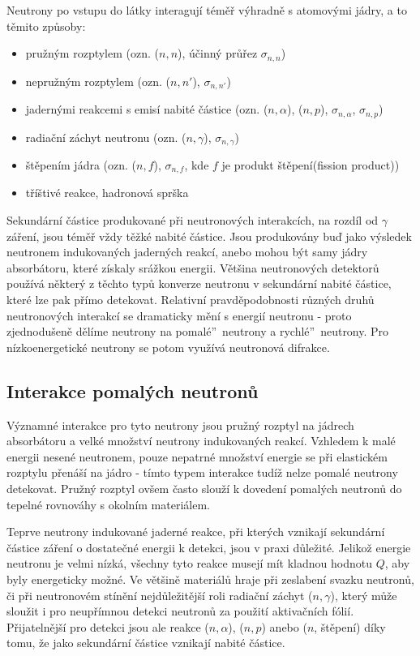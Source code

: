 \documentclass[../../main.tex]{subfiles}
\begin{document}
Neutrony po vstupu do látky interagují téměř výhradně s atomovými jádry, a to těmito způsoby:
\begin{itemize}
	\item pružným rozptylem (ozn. ($n,n$), účinný průřez $\sigma _{n,n}$)
	\item nepružným rozptylem (ozn. ($n,n'$), $\sigma_{n,n'}$)
	\item jadernými reakcemi s emisí nabité částice (ozn. ($n,\alpha$), ($n,p$), $\sigma_{n,\alpha}$, $\sigma_{n,p}$)
	\item radiační záchyt neutronu (ozn. ($n,\gamma$), $\sigma_{n,\gamma}$)
	\item štěpením jádra (ozn. ($n,f$), $\sigma_{n,f}$, kde $f$ je produkt štěpení(fission product))
	\item tříštivé reakce, hadronová sprška
\end{itemize}
Sekundární částice produkované při neutronových interakcích, na rozdíl od $\gamma$ záření, jsou téměř vždy těžké nabité částice. Jsou produkovány buď  jako výsledek neutronem indukovaných jaderných reakcí, anebo mohou být samy jádry absorbátoru, které získaly srážkou energii. Většina neutronových detektorů používá některý z těchto typů konverze neutronu v sekundární nabité částice, které lze pak přímo detekovat. Relativní pravděpodobnosti různých druhů neutronových interakcí se dramaticky mění s energií neutronu - proto zjednodušeně dělíme neutrony na \quotedblbase pomalé\textquotedblright ~neutrony a \quotedblbase rychlé\textquotedblright ~neutrony. Pro nízkoenergetické neutrony se potom využívá neutronová difrakce.

\subsection{Interakce pomalých neutronů}

Významné interakce pro tyto neutrony jsou pružný rozptyl na jádrech absorbátoru a velké množství neutrony indukovaných reakcí. Vzhledem k malé energii nesené neutronem, pouze nepatrné množství energie se při elastickém rozptylu přenáší na jádro - tímto typem interakce tudíž nelze pomalé neutrony detekovat. Pružný rozptyl ovšem často slouží k dovedení pomalých neutronů do tepelné rovnováhy s okolním materiálem.

Teprve neutrony indukované jaderné reakce, při kterých vznikají sekundární částice záření o dostatečné energii k detekci, jsou v praxi důležité. Jelikož energie neutronu je velmi nízká, všechny tyto reakce musejí mít kladnou hodnotu $Q$, aby byly energeticky možné. Ve většině materiálů hraje při zeslabení svazku neutronů, či při neutronovém stínění nejdůležitější roli radiační záchyt ($n, \gamma$), který může sloužit i pro neupřímnou detekci neutronů za použití aktivačních fólií. Přijatelnější pro detekci jsou ale reakce ($n,\alpha$), ($n,p$) anebo ($n$, štěpení) díky tomu, že jako sekundární částice vznikají nabité částice.
\end{document}
